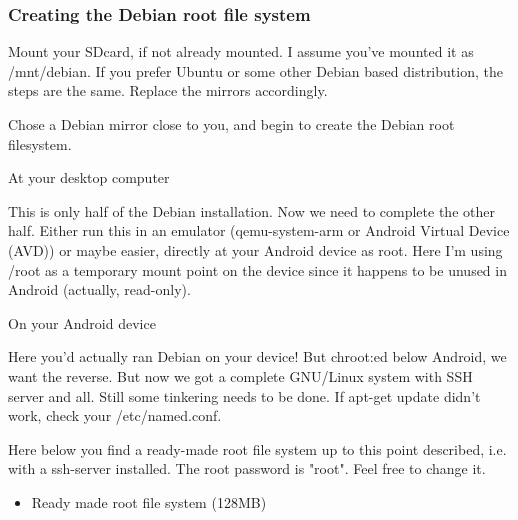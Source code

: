 \subsubsection{Creating the Debian root file system}

Mount your SDcard, if not already mounted. I assume you've mounted it as
/mnt/debian. If you prefer Ubuntu or some other Debian based distribution, the
steps are the same. Replace the mirrors accordingly.

Chose a Debian mirror close to you, and begin to create the Debian root
filesystem.

At your desktop computer


This is only half of the Debian installation. Now we need to complete the other
half. Either run this in an emulator (qemu-system-arm or Android Virtual Device
(AVD)) or maybe easier, directly at your Android device as root. Here I'm using
/root as a temporary mount point on the device since it happens to be unused in
Android (actually, read-only).

On your Android device


Here you'd actually ran Debian on your device! But chroot:ed below Android, we
want the reverse. But now we got a complete GNU/Linux system with SSH server and
all. Still some tinkering needs to be done. If apt-get update didn't work, check
your /etc/named.conf.

Here below you find a ready-made root file system up to this point described,
i.e. with a ssh-server installed. The root password is "root". Feel free to
change it. \smiley

\begin{itemize}
  \item 
Ready made root file system (128MB)
\end{itemize}

